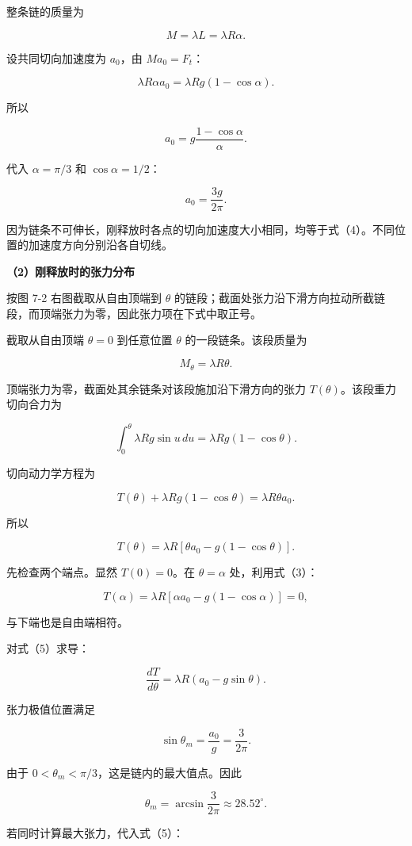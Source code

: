 \documentclass[12pt,a4paper,UTF8]{ctexart}
\begin{document}
整条链的质量为

\[
M=\lambda L=\lambda R\alpha.
\]

设共同切向加速度为 \(a_0\)，由 \(Ma_0=F_t\)：

\[
\lambda R\alpha a_0
=\lambda Rg(1-\cos\alpha).
\]

所以

\[
a_0=g\frac{1-\cos\alpha}{\alpha}.
\tag{3}
\]

代入 \(\alpha=\pi/3\) 和 \(\cos\alpha=1/2\)：

\[
\boxed{a_0=\frac{3g}{2\pi}}.
\tag{4}
\]

因为链条不可伸长，刚释放时各点的切向加速度大小相同，均等于式（4）。不同位置的加速度方向分别沿各自切线。

\textbf{（2）刚释放时的张力分布}

按图 7-2 右图截取从自由顶端到 \(\theta\)
的链段；截面处张力沿下滑方向拉动所截链段，而顶端张力为零，因此张力项在下式中取正号。

截取从自由顶端 \(\theta=0\) 到任意位置 \(\theta\) 的一段链条。该段质量为

\[
M_\theta=\lambda R\theta.
\]

顶端张力为零，截面处其余链条对该段施加沿下滑方向的张力
\(T(\theta)\)。该段重力切向合力为

\[
\int_0^\theta\lambda Rg\sin u\,du
=\lambda Rg(1-\cos\theta).
\]

切向动力学方程为

\[
T(\theta)+\lambda Rg(1-\cos\theta)
=\lambda R\theta a_0.
\]

所以

\[
\boxed{
T(\theta)=\lambda R
\left[\theta a_0-g(1-\cos\theta)\right]
}.
\tag{5}
\]

先检查两个端点。显然 \(T(0)=0\)。在 \(\theta=\alpha\) 处，利用式（3）：

\[
T(\alpha)
=\lambda R[\alpha a_0-g(1-\cos\alpha)]=0,
\]

与下端也是自由端相符。

对式（5）求导：

\[
\frac{dT}{d\theta}
=\lambda R(a_0-g\sin\theta).
\tag{6}
\]

张力极值位置满足

\[
\sin\theta_m=\frac{a_0}{g}=\frac{3}{2\pi}.
\]

由于 \(0<\theta_m<\pi/3\)，这是链内的最大值点。因此

\[
\boxed{
\theta_m=\arcsin\frac{3}{2\pi}
\approx28.52^\circ
}.
\tag{7}
\]

若同时计算最大张力，代入式（5）：
\end{document}
